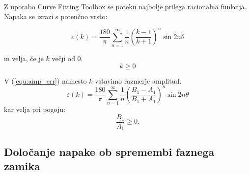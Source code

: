 \documentclass[a4paper]{article}
\begin{document}
Z uporabo Curve Fitting Toolbox se poteku najbolje prilega  racionalna funkcija. Napaka se izrazi s potenčno vrsto:

\begin{equation}
\label{equ:amp_err}
\varepsilon(k) =\frac{180}{\pi}\sum_{n=1}^{\infty}\frac{1}{n}(\frac{k-1}{k+1})^n \sin 2 n \theta
\end{equation}

in velja, če je $k$ večji od 0.$$k \geq 0$$

V (\ref{equ:amp_err}) namesto $k$ vstavimo razmerje amplitud:
\begin{equation}
\label{equ:amp_err2}
\varepsilon(k) =\frac{180}{\pi}\sum_{n=1}^{\infty}\frac{1}{n}(\frac{B_1-A_1}{B_1+A_1})^n \sin 2 n \theta
\end{equation}
kar velja pri pogoju: $$\frac{B_1}{A_1} \geq 0.$$

\subsection{Določanje napake ob spremembi faznega zamika}
\end{document}
